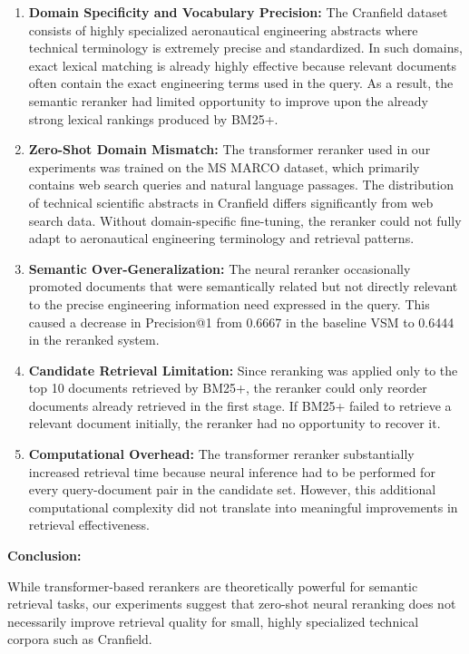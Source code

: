 \documentclass{article}
\begin{document}
\begin{enumerate}
    \item \textbf{Domain Specificity and Vocabulary Precision:}  
    The Cranfield dataset consists of highly specialized aeronautical engineering abstracts where technical terminology is extremely precise and standardized. In such domains, exact lexical matching is already highly effective because relevant documents often contain the exact engineering terms used in the query. As a result, the semantic reranker had limited opportunity to improve upon the already strong lexical rankings produced by BM25+.

    \item \textbf{Zero-Shot Domain Mismatch:}  
    The transformer reranker used in our experiments was trained on the MS MARCO dataset, which primarily contains web search queries and natural language passages. The distribution of technical scientific abstracts in Cranfield differs significantly from web search data. Without domain-specific fine-tuning, the reranker could not fully adapt to aeronautical engineering terminology and retrieval patterns.

    \item \textbf{Semantic Over-Generalization:}  
    The neural reranker occasionally promoted documents that were semantically related but not directly relevant to the precise engineering information need expressed in the query. This caused a decrease in Precision@1 from 0.6667 in the baseline VSM to 0.6444 in the reranked system.

    \item \textbf{Candidate Retrieval Limitation:}  
    Since reranking was applied only to the top 10 documents retrieved by BM25+, the reranker could only reorder documents already retrieved in the first stage. If BM25+ failed to retrieve a relevant document initially, the reranker had no opportunity to recover it.

    \item \textbf{Computational Overhead:}  
    The transformer reranker substantially increased retrieval time because neural inference had to be performed for every query-document pair in the candidate set. However, this additional computational complexity did not translate into meaningful improvements in retrieval effectiveness.
\end{enumerate}

\textbf{Conclusion:}

While transformer-based rerankers are theoretically powerful for semantic retrieval tasks, our experiments suggest that zero-shot neural reranking does not necessarily improve retrieval quality for small, highly specialized technical corpora such as Cranfield.
\end{document}
